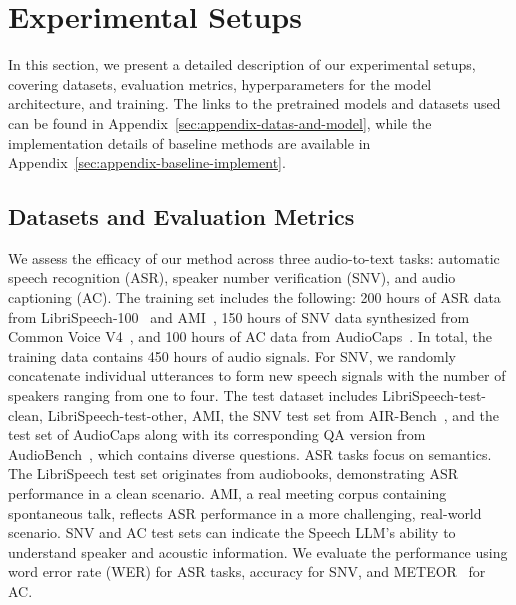 \section{Experimental Setups}

In this section, we present a detailed description of our experimental setups, covering datasets, evaluation metrics, hyperparameters for the model architecture, and training. The links to the pretrained models and datasets used can be found in Appendix~\ref{sec:appendix-datas-and-model}, while the implementation details of baseline methods are available in Appendix~\ref{sec:appendix-baseline-implement}.

\subsection{Datasets and Evaluation Metrics}

We assess the efficacy of our method across three audio-to-text tasks: automatic speech recognition (ASR), speaker number verification (SNV), and audio captioning (AC). The training set includes the following: 200 hours of ASR data from LibriSpeech-100~\cite{panayotov2015librispeech} and AMI~\cite{kraaij2005ami}, 150 hours of SNV data synthesized from Common Voice V4~\cite{ardila2019common}, and 100 hours of AC data from AudioCaps~\cite{audiocaps}. In total, the training data contains 450 hours of audio signals. For SNV, we randomly concatenate individual utterances to form new speech signals with the number of speakers ranging from one to four. The test dataset includes LibriSpeech-test-clean, LibriSpeech-test-other, AMI, the SNV test set from AIR-Bench~\cite{yang2024air}, and the test set of AudioCaps along with its corresponding QA version from AudioBench~\cite{wang2024audiobench}, which contains diverse questions. ASR tasks focus on semantics. The LibriSpeech test set originates from audiobooks, demonstrating ASR performance in a clean scenario. AMI, a real meeting corpus containing spontaneous talk, reflects ASR performance in a more challenging, real-world scenario. SNV and AC test sets can indicate the Speech LLM's ability to understand speaker and acoustic information. We evaluate the performance using word error rate (WER) for ASR tasks, accuracy for SNV, and METEOR~\cite{banerjee2005meteor} for AC. 


